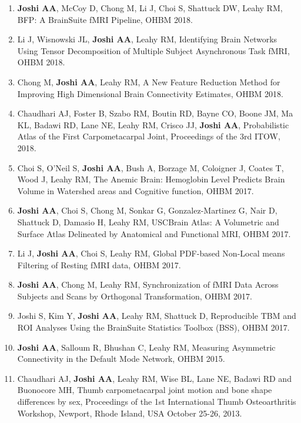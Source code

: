 \documentclass[overlapped,line,letterpaper]{res}
\begin{document}
\begin{resume}
\begin{enumerate}
    \item \textbf{Joshi AA}, McCoy D, Chong M, Li J, Choi S, Shattuck DW, Leahy RM, {BFP: A BrainSuite fMRI Pipeline}, OHBM 2018.

    \item Li J, Wisnowski JL, \textbf{Joshi AA}, Leahy RM, {Identifying Brain Networks Using Tensor Decomposition of Multiple Subject Asynchronous Task fMRI}, OHBM 2018.

    \item Chong M, \textbf{Joshi AA}, Leahy RM, {A New Feature Reduction Method for Improving High Dimensional Brain Connectivity Estimates}, OHBM 2018.

    \item Chaudhari AJ, Foster B, Szabo RM, Boutin RD, Bayne CO, Boone JM, Ma KL, Badawi RD, Lane NE, Leahy RM, Crisco JJ, \textbf{Joshi AA}, {Probabilistic Atlas of the First Carpometacarpal Joint}, Proceedings of the 3rd ITOW, 2018.

    \item Choi S, O'Neil S, \textbf{Joshi AA}, Bush A, Borzage M, Coloigner J, Coates T, Wood J, Leahy RM, {The Anemic Brain: Hemoglobin Level Predicts Brain Volume in Watershed areas and Cognitive function}, OHBM 2017.

    \item \textbf{Joshi AA}, Choi S, Chong M, Sonkar G, Gonzalez-Martinez G, Nair D, Shattuck D,  Damasio H, Leahy RM, {USCBrain Atlas: A Volumetric and Surface Atlas Delineated by Anatomical and Functional MRI}, OHBM 2017.

    \item Li J, \textbf{Joshi AA}, Choi S, Leahy RM, {Global PDF-based Non-Local means Filtering of Resting fMRI data}, OHBM 2017.

    \item \textbf{Joshi AA}, Chong M, Leahy RM, {Synchronization of fMRI Data Across Subjects and Scans by Orthogonal Transformation}, OHBM 2017.

    \item Joshi S, Kim Y, \textbf{Joshi AA}, Leahy RM,  Shattuck D, {Reproducible TBM and ROI Analyses Using the BrainSuite Statistics Toolbox (BSS)}, OHBM 2017.

    \item \textbf{Joshi AA}, Salloum R, Bhushan C, Leahy RM, {Measuring Asymmetric Connectivity in the Default Mode Network}, OHBM 2015.

    \item Chaudhari AJ, \textbf{Joshi AA}, Leahy RM, Wise BL, Lane NE, Badawi RD and Buonocore MH, {Thumb carpometacarpal joint motion and bone shape differences by sex}, Proceedings of the 1st International Thumb Osteoarthritis Workshop, Newport, Rhode Island, USA October 25-26, 2013.


\end{enumerate}
\end{resume}
\end{document}
